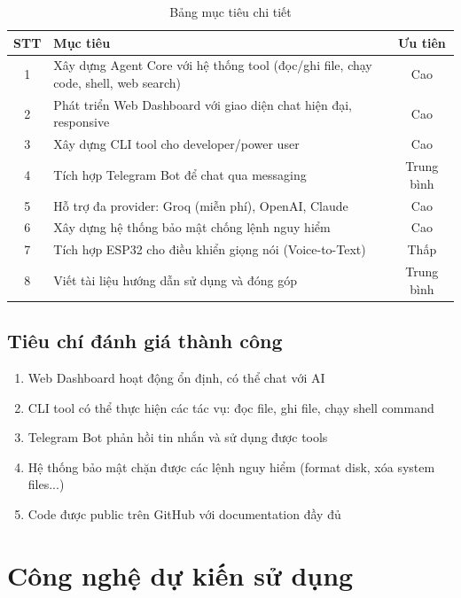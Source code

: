\documentclass[12pt,a4paper]{article}
\begin{document}
\begin{table}[H]
    \centering
    \begin{tabular}{|c|p{10cm}|c|}
        \hline
        \textbf{STT} & \textbf{Mục tiêu} & \textbf{Ưu tiên} \\
        \hline
        1 & Xây dựng Agent Core với hệ thống tool (đọc/ghi file, chạy code, shell, web search) & Cao \\
        \hline
        2 & Phát triển Web Dashboard với giao diện chat hiện đại, responsive & Cao \\
        \hline
        3 & Xây dựng CLI tool cho developer/power user & Cao \\
        \hline
        4 & Tích hợp Telegram Bot để chat qua messaging & Trung bình \\
        \hline
        5 & Hỗ trợ đa provider: Groq (miễn phí), OpenAI, Claude & Cao \\
        \hline
        6 & Xây dựng hệ thống bảo mật chống lệnh nguy hiểm & Cao \\
        \hline
        7 & Tích hợp ESP32 cho điều khiển giọng nói (Voice-to-Text) & Thấp \\
        \hline
        8 & Viết tài liệu hướng dẫn sử dụng và đóng góp & Trung bình \\
        \hline
    \end{tabular}
    \caption{Bảng mục tiêu chi tiết}
\end{table}

\subsection{Tiêu chí đánh giá thành công}

\begin{enumerate}
    \item Web Dashboard hoạt động ổn định, có thể chat với AI
    \item CLI tool có thể thực hiện các tác vụ: đọc file, ghi file, chạy shell command
    \item Telegram Bot phản hồi tin nhắn và sử dụng được tools
    \item Hệ thống bảo mật chặn được các lệnh nguy hiểm (format disk, xóa system files...)
    \item Code được public trên GitHub với documentation đầy đủ
\end{enumerate}

\section{Công nghệ dự kiến sử dụng}
\end{document}
